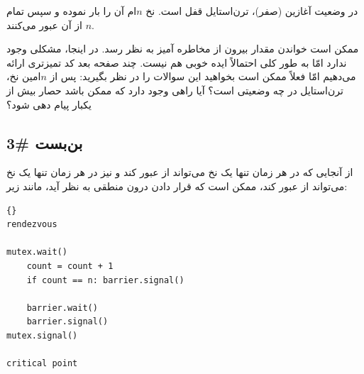 \documentclass{book}
\newcommand{\clearemptydoublepage}{\newpage\cleardoublepage}
\begin{document}
    در وضعیت آغازین (صفر)، ترن‌استایل قفل است. نخ  $n$ام آن را بار نموده و سپس تمام  $n$ از آن عبور می‌کنند. 

    ممکن است خواندن مقدار  بیرون از  مخاطره‌ آمیز به نظر رسد. در اینجا، مشکلی وجود ندارد 
    امّا به طور کلی احتمالاً ایده خوبی هم نیست. چند صفحه بعد کد تمیزتری ارائه می‌دهیم امّا فعلاً ممکن است بخواهید این سوالات را در نظر بگیرید:
    پس از $n$امین نخ، ترن‌استایل در چه وضعیتی است؟ آیا راهی وجود دارد که ممکن باشد حصار بیش از یکبار پیام دهی شود؟

\clearemptydoublepage
\subsection {بن‌بست \#3}

    از آنجایی که در هر زمان تنها یک نخ می‌تواند از  عبور کند و نیز در هر زمان تنها یک نخ می‌تواند از  عبور کند، 
    ممکن است که قرار دادن  درون  منطقی به نظر آید، مانند زیر: 
\begin{latin}
\begin{latin}
\begin{lstlisting}[title=\rl{راه حل بدِ حصار}]{}
rendezvous

mutex.wait()
    count = count + 1
    if count == n: barrier.signal()

    barrier.wait()
    barrier.signal()
mutex.signal()

critical point
\end{lstlisting}
\end{latin}
\end{latin}
\end{document}
